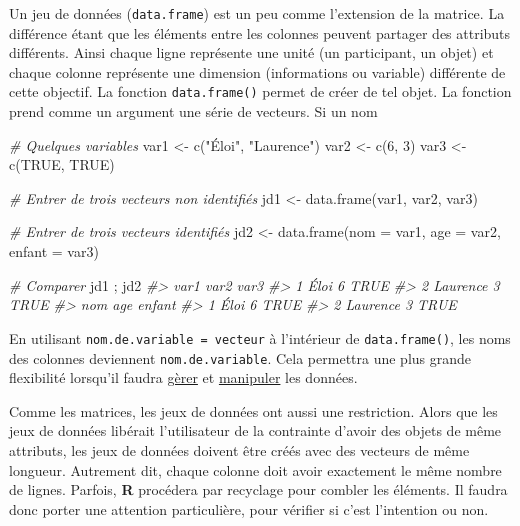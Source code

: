 \documentclass[
]{book}
\newenvironment{Shaded}{}{}
\newcommand{\AttributeTok}[1]{#1}
\newcommand{\CommentTok}[1]{\textit{#1}}
\newcommand{\ConstantTok}[1]{#1}
\newcommand{\DecValTok}[1]{#1}
\newcommand{\FunctionTok}[1]{#1}
\newcommand{\NormalTok}[1]{#1}
\newcommand{\OtherTok}[1]{#1}
\newcommand{\StringTok}[1]{#1}
\begin{document}
Un jeu de données (\texttt{data.frame}) est un peu comme l'extension de la matrice. La différence étant que les éléments entre les colonnes peuvent partager des attributs différents. Ainsi chaque ligne représente une unité (un participant, un objet) et chaque colonne représente une dimension (informations ou variable) différente de cette objectif. La fonction \texttt{data.frame()} permet de créer de tel objet. La fonction prend comme un argument une série de vecteurs. Si un nom

\begin{Shaded}
\begin{Highlighting}[]
\CommentTok{\# Quelques variables}
\NormalTok{var1 }\OtherTok{\textless{}{-}} \FunctionTok{c}\NormalTok{(}\StringTok{"Éloi"}\NormalTok{, }\StringTok{"Laurence"}\NormalTok{)}
\NormalTok{var2 }\OtherTok{\textless{}{-}} \FunctionTok{c}\NormalTok{(}\DecValTok{6}\NormalTok{, }\DecValTok{3}\NormalTok{)}
\NormalTok{var3 }\OtherTok{\textless{}{-}} \FunctionTok{c}\NormalTok{(}\ConstantTok{TRUE}\NormalTok{, }\ConstantTok{TRUE}\NormalTok{)}

\CommentTok{\# Entrer de trois vecteurs non identifiés}
\NormalTok{jd1 }\OtherTok{\textless{}{-}} \FunctionTok{data.frame}\NormalTok{(var1, var2, var3)}

\CommentTok{\# Entrer de trois vecteurs identifiés}
\NormalTok{jd2 }\OtherTok{\textless{}{-}} \FunctionTok{data.frame}\NormalTok{(}\AttributeTok{nom =}\NormalTok{ var1, }\AttributeTok{age =}\NormalTok{ var2, }\AttributeTok{enfant =}\NormalTok{ var3)}

\CommentTok{\# Comparer}
\NormalTok{jd1 ; jd2}
\CommentTok{\#\textgreater{}       var1 var2 var3}
\CommentTok{\#\textgreater{} 1     Éloi    6 TRUE}
\CommentTok{\#\textgreater{} 2 Laurence    3 TRUE}
\CommentTok{\#\textgreater{}        nom age enfant}
\CommentTok{\#\textgreater{} 1     Éloi   6   TRUE}
\CommentTok{\#\textgreater{} 2 Laurence   3   TRUE}
\end{Highlighting}
\end{Shaded}

En utilisant \texttt{nom.de.variable\ =\ vecteur} à l'intérieur de \texttt{data.frame()}, les noms des colonnes deviennent \texttt{nom.de.variable}. Cela permettra une plus grande flexibilité lorsqu'il faudra \protect\hyperlink{guxe8rer}{gèrer} et \protect\hyperlink{manipuler}{manipuler} les données.

Comme les matrices, les jeux de données ont aussi une restriction. Alors que les jeux de données libérait l'utilisateur de la contrainte d'avoir des objets de même attributs, les jeux de données doivent être créés avec des vecteurs de même longueur. Autrement dit, chaque colonne doit avoir exactement le même nombre de lignes. Parfois, \textbf{R} procédera par recyclage pour combler les éléments. Il faudra donc porter une attention particulière, pour vérifier si c'est l'intention ou non.
\end{document}
